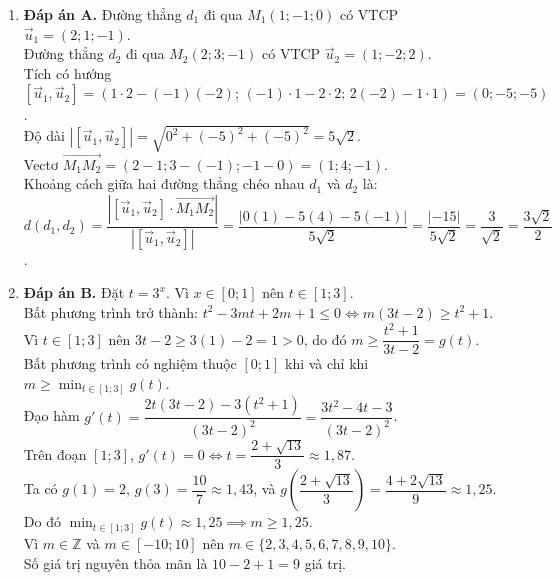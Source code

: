 \documentclass[12pt,a4paper]{article}
\begin{document}
\begin{enumerate}[label=\textbf{Câu \arabic*:}, leftmargin=*]
\item \textbf{Đáp án A.} Đường thẳng $d_1$ đi qua $M_1(1; -1; 0)$ có VTCP $\vec{u}_1 = (2; 1; -1)$.\\
Đường thẳng $d_2$ đi qua $M_2(2; 3; -1)$ có VTCP $\vec{u}_2 = (1; -2; 2)$.\\
Tích có hướng $[\vec{u}_1, \vec{u}_2] = (1 \cdot 2 - (-1)(-2); \, (-1) \cdot 1 - 2 \cdot 2; \, 2(-2) - 1 \cdot 1) = (0; -5; -5)$.\\
Độ dài $|[\vec{u}_1, \vec{u}_2]| = \sqrt{0^2 + (-5)^2 + (-5)^2} = 5\sqrt{2}$.\\
Vectơ $\overrightarrow{M_1 M_2} = (2 - 1; 3 - (-1); -1 - 0) = (1; 4; -1)$.\\
Khoảng cách giữa hai đường thẳng chéo nhau $d_1$ và $d_2$ là:\\
$d(d_1, d_2) = \dfrac{|[\vec{u}_1, \vec{u}_2] \cdot \overrightarrow{M_1 M_2}|}{|[\vec{u}_1, \vec{u}_2]|} = \dfrac{|0(1) - 5(4) - 5(-1)|}{5\sqrt{2}} = \dfrac{|-15|}{5\sqrt{2}} = \dfrac{3}{\sqrt{2}} = \dfrac{3\sqrt{2}}{2}$.

\item \textbf{Đáp án B.} Đặt $t = 3^x$. Vì $x \in [0; 1]$ nên $t \in [1; 3]$.\\
Bất phương trình trở thành: $t^2 - 3mt + 2m + 1 \le 0 \iff m(3t - 2) \ge t^2 + 1$.\\
Vì $t \in [1; 3]$ nên $3t - 2 \ge 3(1) - 2 = 1 > 0$, do đó $m \ge \dfrac{t^2 + 1}{3t - 2} = g(t)$.\\
Bất phương trình có nghiệm thuộc $[0; 1]$ khi và chỉ khi $m \ge \min_{t \in [1; 3]} g(t)$.\\
Đạo hàm $g'(t) = \dfrac{2t(3t - 2) - 3(t^2 + 1)}{(3t - 2)^2} = \dfrac{3t^2 - 4t - 3}{(3t - 2)^2}$.\\
Trên đoạn $[1; 3]$, $g'(t) = 0 \iff t = \dfrac{2 + \sqrt{13}}{3} \approx 1{,}87$.\\
Ta có $g(1) = 2$, $g(3) = \dfrac{10}{7} \approx 1{,}43$, và $g\left(\dfrac{2 + \sqrt{13}}{3}\right) = \dfrac{4 + 2\sqrt{13}}{9} \approx 1{,}25$.\\
Do đó $\min_{t \in [1; 3]} g(t) \approx 1{,}25 \implies m \ge 1{,}25$.\\
Vì $m \in \mathbb{Z}$ và $m \in [-10; 10]$ nên $m \in \{2, 3, 4, 5, 6, 7, 8, 9, 10\}$.\\
Số giá trị nguyên thỏa mãn là $10 - 2 + 1 = 9$ giá trị.


\end{enumerate}
\end{document}
